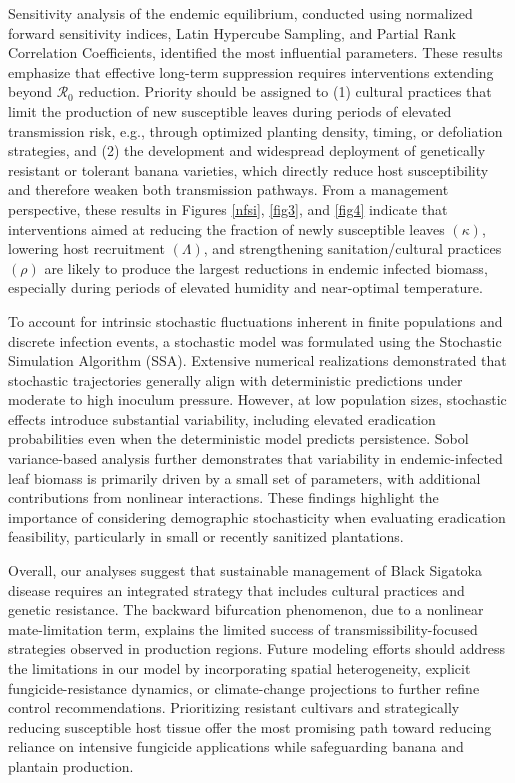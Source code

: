 \documentclass[11pt]{article}
\numberwithin{equation}{section}
\begin{document}
Sensitivity analysis of the endemic equilibrium, conducted using normalized forward sensitivity indices, Latin Hypercube Sampling, and Partial Rank Correlation Coefficients, identified the most influential parameters. These results emphasize that effective long-term suppression requires interventions extending beyond $\mathcal{R}_0$ reduction. Priority should be assigned to (1) cultural practices that limit the production of new susceptible leaves during periods of elevated transmission risk, e.g., through optimized planting density, timing, or defoliation strategies, and (2) the development and widespread deployment of genetically resistant or tolerant banana varieties, which directly reduce host susceptibility and therefore weaken both transmission pathways. From a management perspective, these results in Figures \ref{nfsi}, 
\ref{fig3}, and \ref{fig4} indicate that interventions aimed at reducing the fraction of newly susceptible leaves $(\kappa)$, lowering host recruitment $(\Lambda)$, and strengthening sanitation/cultural practices $(\rho)$ are likely to produce the largest reductions in endemic infected biomass, especially during periods of elevated humidity and near-optimal temperature.

To account for intrinsic stochastic fluctuations inherent in finite populations and discrete infection events, a stochastic model was formulated using the Stochastic Simulation Algorithm (SSA). Extensive numerical realizations demonstrated that stochastic trajectories generally align with deterministic predictions under moderate to high inoculum pressure. However, at low population sizes, stochastic effects introduce substantial variability, including elevated eradication probabilities even when the deterministic model predicts persistence. Sobol variance-based analysis further demonstrates that variability in endemic-infected leaf biomass is primarily driven by a small set of parameters, with additional contributions from nonlinear interactions. These findings highlight the importance of considering demographic stochasticity when evaluating eradication feasibility, particularly in small or recently sanitized plantations.

Overall, our analyses suggest that sustainable management of Black Sigatoka disease requires an integrated strategy that includes cultural practices and genetic resistance. The backward bifurcation phenomenon, due to a nonlinear mate-limitation term, explains the limited success of transmissibility-focused strategies observed in production regions. Future modeling efforts should address the limitations in our model by incorporating spatial heterogeneity, explicit fungicide-resistance dynamics, or climate-change projections to further refine control recommendations. Prioritizing resistant cultivars and strategically reducing susceptible host tissue offer the most promising path toward reducing reliance on intensive fungicide applications while safeguarding banana and plantain production.

\clearpage


\end{document}

